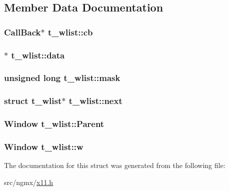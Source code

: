 \subsection{\-Member \-Data \-Documentation}
\hypertarget{structt__wlist_a3cf36d2852bf002d53ac4996968d18eb}{
\subsubsection[{cb}]{\setlength{\rightskip}{0pt plus 5cm}\-Call\-Back$\ast$ {\bf t\-\_\-wlist\-::cb}}}\label{structt__wlist_a3cf36d2852bf002d53ac4996968d18eb}
\hypertarget{structt__wlist_a61ba92badbd525c2621f7224da9ab252}{
\subsubsection[{data}]{$\ast$ {\bf t\-\_\-wlist\-::data}}}\label{structt__wlist_a61ba92badbd525c2621f7224da9ab252}
\hypertarget{structt__wlist_aad10a7561fc500359a70400eb2e1ccb8}{
\subsubsection[{mask}]{\setlength{\rightskip}{0pt plus 5cm}unsigned long {\bf t\-\_\-wlist\-::mask}}}\label{structt__wlist_aad10a7561fc500359a70400eb2e1ccb8}
\hypertarget{structt__wlist_aa70b5dbf4b5f4f7f5e3fd8c82875ca57}{
\subsubsection[{next}]{\setlength{\rightskip}{0pt plus 5cm}struct {\bf t\-\_\-wlist}$\ast$ {\bf t\-\_\-wlist\-::next}}}\label{structt__wlist_aa70b5dbf4b5f4f7f5e3fd8c82875ca57}
\hypertarget{structt__wlist_a1831216a15911ce8e66ed57ccaeff3e7}{
\subsubsection[{\-Parent}]{\setlength{\rightskip}{0pt plus 5cm}\-Window {\bf t\-\_\-wlist\-::\-Parent}}}\label{structt__wlist_a1831216a15911ce8e66ed57ccaeff3e7}
\hypertarget{structt__wlist_adc2c39819bfd58e1bcfd137338d0ac79}{
\subsubsection[{w}]{\setlength{\rightskip}{0pt plus 5cm}\-Window {\bf t\-\_\-wlist\-::w}}}\label{structt__wlist_adc2c39819bfd58e1bcfd137338d0ac79}


\-The documentation for this struct was generated from the following file\-:\begin{DoxyCompactItemize}
\item 
src/ngmx/\hyperlink{x11_8h}{x11.\-h}\end{DoxyCompactItemize}
